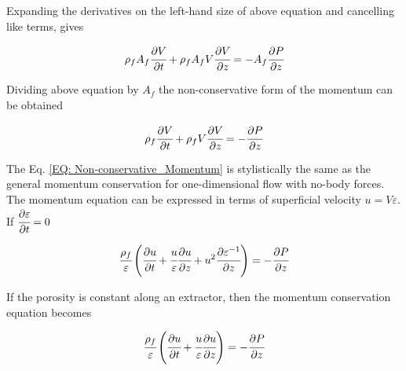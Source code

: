 \documentclass[../Parameter_fitting.tex]{subfiles}
\begin{document}
	Expanding the derivatives on the left-hand size of above equation and cancelling like terms, gives

	{\footnotesize
		\begin{equation}
			\rho_f A_f \cfrac{\partial V}{\partial t} + \rho_f A_f V \cfrac{\partial V}{\partial z} = -A_f \cfrac{\partial P}{\partial z}
		\end{equation}
	}

	Dividing above equation by $A_f$ the non-conservative form of the momentum can be obtained
	
	{\footnotesize
		\begin{equation}
			\rho_f \cfrac{\partial V}{\partial t} + \rho_f V \cfrac{\partial V}{\partial z} = -\cfrac{\partial P}{\partial z}
			\label{EQ: Non-conservative_Momentum}
		\end{equation}
	}

	The Eq. \ref{EQ: Non-conservative_Momentum} is stylistically the same as the general momentum conservation for one-dimensional flow with no-body forces. The momentum equation can be expressed in terms of superficial velocity $u=V\varepsilon$. If $\cfrac{\partial \varepsilon}{\partial t}=0$
	
	{\footnotesize
		\begin{equation}
			\cfrac{\rho_f}{\varepsilon} \left( \cfrac{\partial u}{\partial t} + \cfrac{u}{\varepsilon} \cfrac{\partial u}{\partial z} + u^2 \cfrac{\partial \varepsilon^{-1}}{\partial z} \right) = -\cfrac{\partial P}{\partial z}
		\end{equation}
	}

	If the porosity is constant along an extractor, then the momentum conservation equation becomes
	
	{\footnotesize
		\begin{equation}
			\cfrac{\rho_f}{\varepsilon} \left( \cfrac{\partial u}{\partial t} + \cfrac{u}{\varepsilon} \cfrac{\partial u}{\partial z} \right) = -\cfrac{\partial P}{\partial z}
		\end{equation}
	}
	
	
	
	
	
	
	
	
	
	
	
	
	
	
	
	
	
	
	
	
	
	
\end{document}
